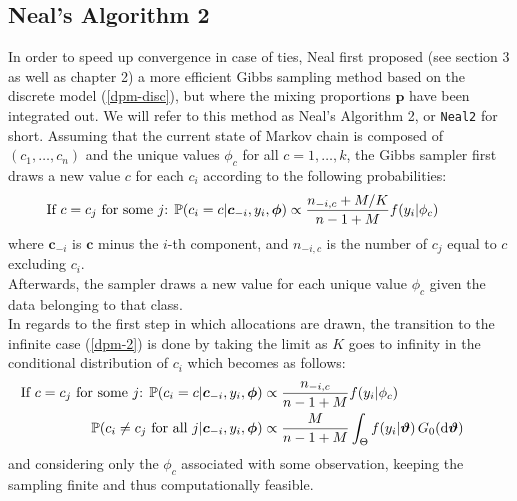 \subsection{Neal's Algorithm 2} \label{neal2}
In order to speed up convergence in case of ties, Neal first proposed (see \cite{neal} section 3 as well as \cite{book} chapter 2) a more efficient Gibbs sampling method based on the discrete model (\ref{dpm-disc}), but where the mixing proportions $\textbf{p}$ have been integrated out.
We will refer to this method as Neal's Algorithm 2, or \verb|Neal2| for short.
Assuming that the current state of Markov chain is composed of $(c_1,\dots,c_n)$  and the unique values $\phi_c$ for all $c=1,\dots,k$, the Gibbs sampler first draws a new value $c$ for each $c_i$ according to the following probabilities:
\begin{align}
	\hspace{-25pt}
	\vspace{-12pt}
	\text{If $c=c_j$ for some $j$: }
	\PP(c_{i}=c | \boldsymbol c_{-i}, y_{i},\boldsymbol\phi) \propto \frac{n_{-i,c} + M/{K}}{n-1+M} f(y_{i}|\phi_{c}) 
\end{align}
where $\boldsymbol c_{-i}$ is $\boldsymbol c$ minus the $i$-th component, and $n_{-i,c}$ is the number of $c_j$ equal to $c$ excluding $c_i$. \\
Afterwards, the sampler draws a new value for each unique value $\phi_c$ given the data belonging to that class. \\ %
In regards to the first step in which allocations are drawn, the transition to the infinite case (\ref{dpm-2}) is done by taking the limit as $K$ goes to infinity in the conditional distribution of $c_i$ which becomes as follows:
\begin{equation}
	\begin{aligned} \label{probasneal2}
	\hspace{-25pt}
	\vspace{-12pt}
	\text{If $c=c_j$ for some $j$: }
	\PP(c_{i}=c | \boldsymbol c_{-i}, y_{i},\boldsymbol\phi) &\propto \frac{n_{-i,c} }{n-1+M} f(y_{i}|\phi_{c}) \\
	\PP(c_{i}\neq c_{j} \text{ for all } j | \boldsymbol c_{-i}, y_{i},\boldsymbol\phi) &\propto \frac{M }{n-1+M} \int_{\Theta} f(y_{i}|\boldsymbol\theta) \, G_0(\de\boldsymbol\theta)
	\end{aligned}
\end{equation}
and considering only the $\phi_c$ associated with some observation, keeping the sampling finite and thus computationally feasible.
